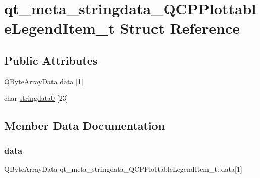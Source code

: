 \hypertarget{structqt__meta__stringdata__QCPPlottableLegendItem__t}{}\section{qt\+\_\+meta\+\_\+stringdata\+\_\+\+Q\+C\+P\+Plottable\+Legend\+Item\+\_\+t Struct Reference}
\label{structqt__meta__stringdata__QCPPlottableLegendItem__t}
\subsection*{Public Attributes}
\begin{DoxyCompactItemize}
\item 
Q\+Byte\+Array\+Data \mbox{\hyperlink{structqt__meta__stringdata__QCPPlottableLegendItem__t_a56d928faacdea012d9b501b879ef98a8}{data}} \mbox{[}1\mbox{]}
\item 
char \mbox{\hyperlink{structqt__meta__stringdata__QCPPlottableLegendItem__t_a2add548f134b64b363d6ee1b2125da1d}{stringdata0}} \mbox{[}23\mbox{]}
\end{DoxyCompactItemize}


\subsection{Member Data Documentation}
\mbox{\label{structqt__meta__stringdata__QCPPlottableLegendItem__t_a56d928faacdea012d9b501b879ef98a8}} 
\subsubsection{\texorpdfstring{data}{data}}
{\footnotesize\ttfamily Q\+Byte\+Array\+Data qt\+\_\+meta\+\_\+stringdata\+\_\+\+Q\+C\+P\+Plottable\+Legend\+Item\+\_\+t\+::data\mbox{[}1\mbox{]}}

\mbox{\label{structqt__meta__stringdata__QCPPlottableLegendItem__t_a2add548f134b64b363d6ee1b2125da1d}} 
